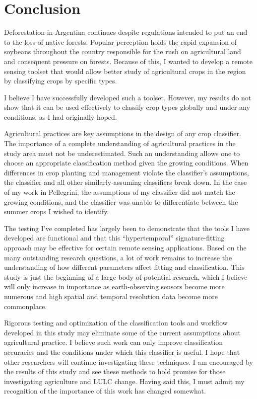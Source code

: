 \chapter{Conclusion}
\label{conclusion}

Deforestation in Argentina continues despite regulations intended to put an end to the loss of native forests. Popular perception holds the rapid expansion of soybeans throughout the country responsible for the rush on agricultural land and consequent pressure on forests. Because of this, I wanted to develop a remote sensing toolset that would allow better study of agricultural crops in the region by classifying crops by specific types.

I believe I have successfully developed such a toolset. However, my results do not show that it can be used effectively to classify crop types globally and under any conditions, as I had originally hoped.

Agricultural practices are key assumptions in the design of any crop classifier. The importance of a complete understanding of agricultural practices in the study area must not be underestimated. Such an understanding allows one to choose an appropriate classification method given the growing conditions. When differences in crop planting and management violate the classifier's assumptions, the classifier and all other similarly-assuming classifiers break down. In the case of my work in Pellegrini, the assumptions of my classifier did not match the growing conditions, and the classifier was unable to differentiate between the summer crops I wished to identify.

The testing I’ve completed has largely been to demonstrate that the tools I have developed are functional and that this ``hypertemporal'' signature-fitting approach may be effective for certain remote sensing applications. Based on the many outstanding research questions, a lot of work remains to increase the understanding of how different parameters affect fitting and classification. This study is just the beginning of a large body of potential research, which I believe will only increase in importance as earth-observing sensors become more numerous and high spatial and temporal resolution data become more commonplace.

Rigorous testing and optimization of the classification tools and workflow developed in this study may eliminate some of the current assumptions about agricultural practice. I believe such work can only improve classification accuracies and the conditions under which this classifier is useful. I hope that other researchers will continue investigating these techniques. I am encouraged by the results of this study and see these methods to hold promise for those investigating agriculture and LULC change. Having said this, I must admit my recognition of the importance of this work has changed somewhat.

